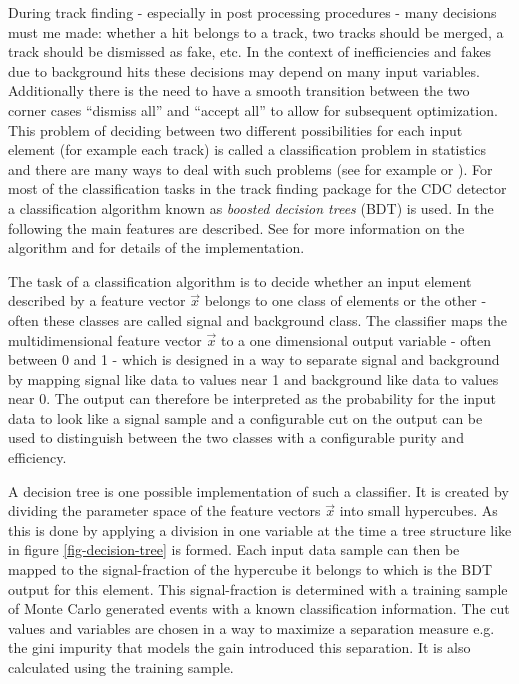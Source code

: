 During track finding - especially in post processing procedures - many decisions must me made: whether a hit belongs to a track, two tracks should be merged, a track should be dismissed as fake, etc. In the context of inefficiencies and fakes due to background hits these decisions may depend on many input variables. Additionally there is the need to have a smooth transition between the two corner cases ``dismiss all'' and ``accept all'' to allow for subsequent optimization. This problem of deciding between two different possibilities for each input element (for example each track) is called a classification problem in statistics and there are many ways to deal with such problems (see for example \cite{cowan} or \cite{blobel}). For most of the classification tasks in the track finding package for the CDC detector a classification algorithm known as \emph{boosted decision trees} (BDT) is used. In the following the main features are described. See \cite{friedman} for more information on the algorithm and \cite{keck} for details of the implementation.

The task of a classification algorithm is to decide whether an input element described by a feature vector $\vec x$ belongs to one class of elements or the other - often these classes are called signal and background class. The classifier maps the multidimensional feature vector $\vec x$ to a one dimensional output variable - often between 0 and 1 - which is designed in a way to separate signal and background by mapping signal like data to values near 1 and background like data to values near 0. The output can therefore be interpreted as the probability for the input data to look like a signal sample and a configurable cut on the output can be used to distinguish between the two classes with a configurable purity and efficiency.

A decision tree is one possible implementation of such a classifier. It is created by dividing the parameter space of the feature vectors $\vec x$ into small hypercubes. As this is done by applying a division in one variable at the time a tree structure like in figure \ref{fig-decision-tree} is formed. Each input data sample can then be mapped to the signal-fraction of the hypercube it belongs to which is the BDT output for this element. This signal-fraction is determined with a training sample of Monte Carlo generated events with a known classification information. The cut values and variables are chosen in a way to maximize a separation measure e.g. the gini impurity that models the gain introduced this separation. It is also calculated using the training sample. 

